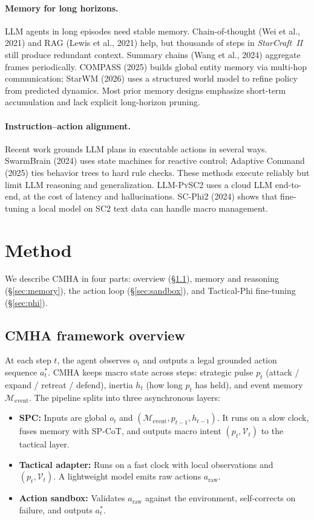 \documentclass[11pt,a4paper]{article}
\begin{document}
\paragraph{Memory for long horizons.}
LLM agents in long episodes need stable memory. Chain-of-thought (Wei et al., 2021) and RAG (Lewis et al., 2021) help, but thousands of steps in \textit{StarCraft~II} still produce redundant context. Summary chains (Wang et al., 2024) aggregate frames periodically. COMPASS (2025) builds global entity memory via multi-hop communication; StarWM (2026) uses a structured world model to refine policy from predicted dynamics. Most prior memory designs emphasize short-term accumulation and lack explicit long-horizon pruning.

\paragraph{Instruction--action alignment.}
Recent work grounds LLM plans in executable actions in several ways. SwarmBrain (2024) uses state machines for reactive control; Adaptive Command (2025) ties behavior trees to hard rule checks. These methods execute reliably but limit LLM reasoning and generalization. \textsc{LLM-PySC2} \citep{ma2025} uses a cloud LLM end-to-end, at the cost of latency and hallucinations. SC-Phi2 (2024) shows that fine-tuning a local model on SC2 text data can handle macro management.

\section{Method}

We describe CMHA in four parts: overview (\S\ref{sec:overview}), memory and reasoning (\S\ref{sec:memory}), the action loop (\S\ref{sec:sandbox}), and Tactical-Phi fine-tuning (\S\ref{sec:phi}).


\subsection{CMHA framework overview}
\label{sec:overview}

At each step $t$, the agent observes $o_t$ and outputs a legal grounded action sequence $a^*_t$. CMHA keeps macro state across steps: strategic pulse $p_t$ (attack / expand / retreat / defend), inertia $h_t$ (how long $p_t$ has held), and event memory $\mathcal{M}_{\text{event}}$. The pipeline splits into three asynchronous layers:
\begin{itemize}
  \item \textbf{SPC:} Inputs are global $o_t$ and $(\mathcal{M}_{\text{event}}, p_{t-1}, h_{t-1})$. It runs on a slow clock, fuses memory with SP-CoT, and outputs macro intent $(p_t, \mathcal{V}_t)$ to the tactical layer.
  \item \textbf{Tactical adapter:} Runs on a fast clock with local observations and $(p_t, \mathcal{V}_t)$. A lightweight model emits raw actions $a_{\text{raw}}$.
  \item \textbf{Action sandbox:} Validates $a_{\text{raw}}$ against the environment, self-corrects on failure, and outputs $a^*_t$.
\end{itemize}
\end{document}
